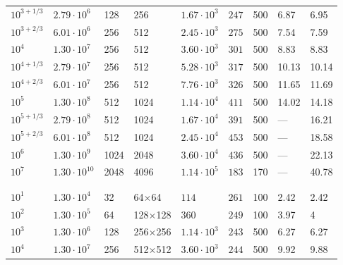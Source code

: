 \documentclass[aps, pre, onecolumn, nofootinbib, notitlepage, groupedaddress, amsfonts, amssymb, amsmath, longbibliography]{revtex4-1}
\begin{document}
\begin{table}
\begin{center}
\begin{tabularx}{\textwidth}{ X X X X | X X X | X X }
$10^{3 + 1/3}$	&	$2.79 \cdot 10^6$	&	128	&	256	&	$1.67 \cdot 10^3$	&	$247$	&	500	&	6.87	&	6.95	\\
$10^{3 + 2/3}$	&	$6.01 \cdot 10^6$	&	256	&	512	&	$2.45 \cdot 10^3$	&	$275$	&	500	&	7.54	&	7.59	\\
$10^4$	&	$1.30 \cdot 10^7$	&	256	&	512	&	$3.60 \cdot 10^3$	&	$301$	&	500	&	8.83	&	8.83	\\
$10^{4 + 1/3}$	&	$2.79 \cdot 10^7$	&	256	&	512	&	$5.28 \cdot 10^3$	&	$317$	&	500	&	10.13	&	10.14	\\
$10^{4 + 2/3}$	&	$6.01 \cdot 10^7$	&	256	&	512	&	$7.76 \cdot 10^3$	&	$326$	&	500	&	11.65	&	11.69	\\
$10^5$	&	$1.30 \cdot 10^8$	&	512	&	1024	&	$1.14 \cdot 10^4$	&	$411$	&	500	&	14.02	&	14.18	\\
$10^{5 + 1/3}$	&	$2.79 \cdot 10^8$	&	512	&	1024	&	$1.67 \cdot 10^4$	&	$391$	&	500	&	---	&	16.21	\\
$10^{5 + 2/3}$	&	$6.01 \cdot 10^8$	&	512	&	1024	&	$2.45 \cdot 10^4$	&	$453$	&	500	&	---	&	18.58	\\
$10^6$	&	$1.30 \cdot 10^9$	&	1024	&	2048	&	$3.60 \cdot 10^4$	&	$436$	&	500	&	---	&	22.13	\\
$10^7$	&	$1.30 \cdot 10^{10}$	&	2048	&	4096	&	$1.14 \cdot 10^5$	&	$183$	&	170	&	---	&	40.78	\\
\\ \hline \hline \\																	
$10^1$	&	$1.30 \cdot 10^4$	&	32	&	64$\times$64	&	$114$	&	$261$	&	100	&	2.42	&	2.42	\\
$10^2$	&	$1.30 \cdot 10^5$	&	64	&	128$\times$128	&	$360$	&	$249$	&	100	&	3.97	&	4	\\
$10^3$	&	$1.30 \cdot 10^6$	&	128	&	256$\times$256	&	$1.14 \cdot 10^3$	&	$243$	&	500	&	6.27	&	6.27	\\
$10^4$	&	$1.30 \cdot 10^7$	&	256	&	512$\times$512	&	$3.60 \cdot 10^3$	&	$244$	&	500	&	9.92	&	9.88	\\
\hline																	
\end{tabularx}
\end{center}
\end{table}






\end{document}
